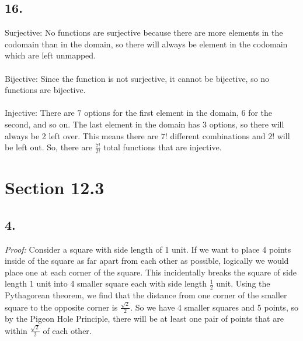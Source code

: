 \documentclass[12pt]{article}
\begin{document}
\begin{minipage}[t]{0.40\textwidth}


\subsection*{16.} Surjective: No functions are surjective because there are more elements in the codomain than in the domain, so there will always be element in the codomain which are left unmapped.
\\\\Bijective: Since the function is not surjective, it cannot be bijective, so no functions are bijective.
\\\\Injective: There are $ 7 $ options for the first element in the domain, 6 for the second, and so on. The last element in the domain has 3 options, so there will always be 2 left over. This means there are $ 7! $ different combinations and $ 2! $ will be left out. So, there are $ \frac{7!}{2!} $ total functions that are injective.

\section*{Section 12.3}
\subsection*{4.}
\textit{Proof:} Consider a square with side length of 1 unit. If we want to place 4 points inside of the square as far apart from each other as possible, logically we would place one at each corner of the square. This incidentally breaks the square of side length 1 unit into 4 smaller square each with side length $ \frac{1}{2} $ unit. Using the Pythagorean theorem, we find that the distance from one corner of the smaller square to the opposite corner is $ \frac{\sqrt{2}}{2} $. So we have 4 smaller squares and 5 points, so by the Pigeon Hole Principle, there will be at least one pair of points that are within $ \frac{\sqrt{2}}{2} $ of each other.    

\end{minipage}
\hfill\vline\hfill
\end{document}
